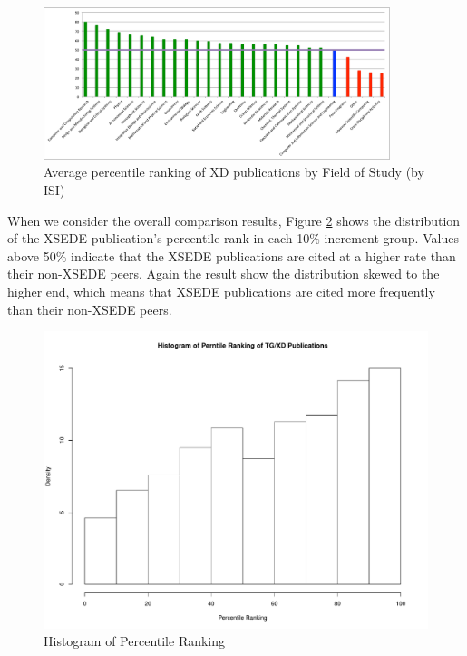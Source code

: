 \documentclass{sig-alternate}
\begin{document}
\begin{figure}[htb!]
  \centering
    \includegraphics[width=0.9\textwidth]{images/isi_peers_fos.pdf}
    \caption{Average percentile ranking of XD publications by Field of Study (by ISI)}
    \label{F:isi_peers_fos}
\end{figure}

When we consider the overall comparison results, Figure \ref{F:ptranking_hist} shows
the distribution of the XSEDE publication's percentile rank in each 10\% increment group. Values above 50\% indicate that the XSEDE publications are cited at a higher rate than their non-XSEDE peers.
Again the result show the distribution skewed to the higher end, which means that
XSEDE publications are cited more frequently than their non-XSEDE peers.

\begin{figure}[htb!]
    \includegraphics[width=0.95\columnwidth]{images/ptranking_histogram.pdf}
    \caption{Histogram of Percentile Ranking}
    \label{F:ptranking_hist}
\end{figure}
\end{document}
